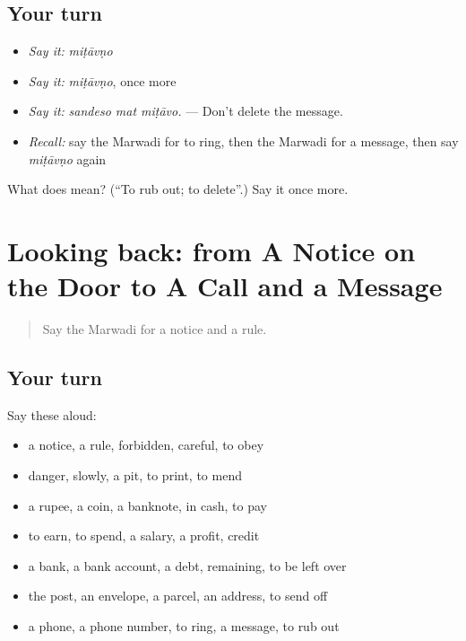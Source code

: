 \subsection*{Your turn}
\begin{itemize}
\raggedright
  \item \emph{Say it:} \emph{miṭāvṇo}
  \item \emph{Say it:} \emph{miṭāvṇo}, once more
  \item \emph{Say it:} \emph{sandeso mat miṭāvo.} — Don't delete the message.
  \item \emph{Recall:} say the Marwadi for to ring, then the Marwadi for a message, then say \emph{miṭāvṇo} again
\end{itemize}

\begin{tcolorbox}[breakable,colback=teal!4,colframe=teal!35!black,title={Before you move on}]
What does  mean? (\textquotedblleft{}To rub out; to delete\textquotedblright{}.) Say it once more.
\end{tcolorbox}
\section[(dialogue)]{Looking back: from A Notice on the Door to A Call and a Message}

\label{lesson:MW-R197-review-191-197}



\begin{quote}
Say the Marwadi for a notice and a rule.
\end{quote}

\subsection*{Your turn}
Say these aloud:

\begin{itemize}
\raggedright
  \item a notice, a rule, forbidden, careful, to obey
  \item danger, slowly, a pit, to print, to mend
  \item a rupee, a coin, a banknote, in cash, to pay
  \item to earn, to spend, a salary, a profit, credit
  \item a bank, a bank account, a debt, remaining, to be left over
  \item the post, an envelope, a parcel, an address, to send off
  \item a phone, a phone number, to ring, a message, to rub out
\end{itemize}

